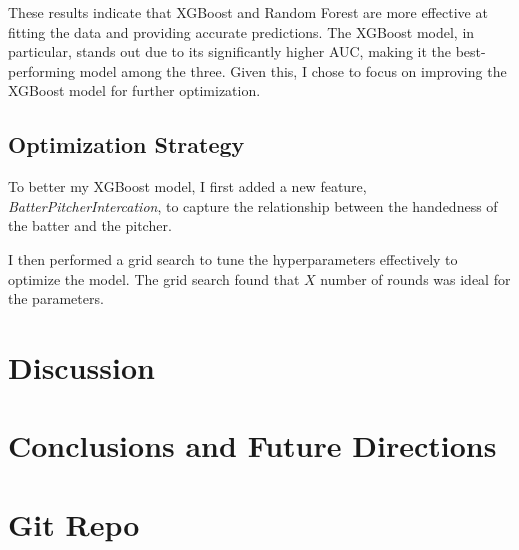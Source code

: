 \documentclass{article}
\begin{document}
These results indicate that XGBoost and Random Forest are more effective at fitting the data and providing accurate predictions. The XGBoost model, in particular, stands out due to its significantly higher AUC, making it the best-performing model among the three. Given this, I chose to focus on improving the XGBoost model for further optimization.

\subsection{Optimization Strategy}
To better my XGBoost model, I first added a new feature, \textit{BatterPitcherIntercation}, to capture the relationship between the handedness of the batter and the pitcher. 

I then performed a grid search to tune the hyperparameters effectively to optimize the model. The grid search found that $X$ number of rounds was ideal for the parameters. 



\newpage
\section{Discussion}

\newpage
\section{Conclusions and Future Directions}

\newpage
\section{Git Repo}
\end{document}
